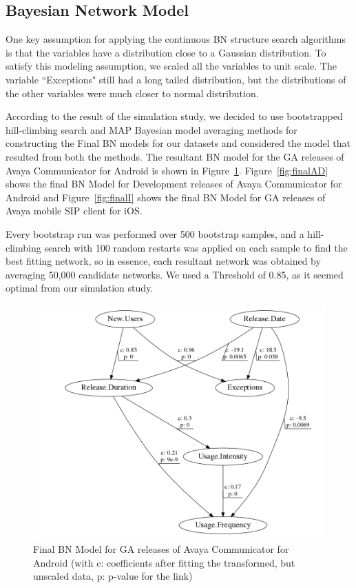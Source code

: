 \documentclass[smallextended]{svjour3}       %
\begin{document}
\subsection{Bayesian Network Model}
One key assumption for applying the continuous BN structure search algorithms 
is that the variables have a distribution close to a Gaussian distribution.
To satisfy this modeling assumption, we scaled all the
variables to unit scale. The variable ``Exceptions" still had a long
tailed distribution, but the distributions of the other variables
were much closer to normal distribution.

According to the result of the simulation study, we decided to use bootstrapped hill-climbing search and MAP Bayesian model averaging methods for constructing the Final BN models for our datasets and considered the model that resulted from both the methods. 
The resultant BN model for the GA releases of Avaya Communicator for Android is shown in Figure~\ref{fig:finalAGA}.  Figure~\ref{fig:finalAD} shows the final BN Model for Development releases of Avaya Communicator for Android and Figure~\ref{fig:finalI} shows the final BN Model for GA releases of Avaya mobile SIP client for iOS.

Every bootstrap run was performed over 500 bootstrap samples, and a
hill-climbing search  with 100 random restarts was applied on each sample 
to find the best fitting network, so in essence, each resultant network was 
obtained by averaging 50,000 candidate networks. We used a Threshold of 0.85, as it seemed optimal from our simulation study.

\begin{figure}[!t]
\centering
\includegraphics[width=0.7\linewidth]{AGA}%
\caption{Final BN Model for GA releases of Avaya Communicator for Android (with c: coefficients after fitting the transformed, but unscaled data, p: p-value  for the link) }
\label{fig:finalAGA}
\end{figure}
\end{document}

